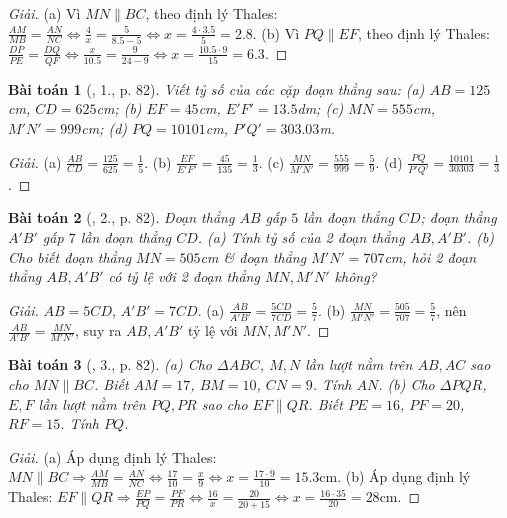 \documentclass{article}
\newtheorem{baitoan}{Bài toán}
\begin{document}
\begin{proof}[Giải]
	(a) Vì $MN\parallel BC$, theo định lý Thales: $\frac{AM}{MB} = \frac{AN}{NC}\Leftrightarrow\frac{4}{x} = \frac{5}{8.5 - 5}\Leftrightarrow x = \frac{4\cdot3.5}{5} = 2.8$. (b) Vì $PQ\parallel EF$, theo định lý Thales: $\frac{DP}{PE} = \frac{DQ}{QF}\Leftrightarrow\frac{x}{10.5} = \frac{9}{24 - 9}\Leftrightarrow x = \frac{10.5\cdot9}{15} = 6.3$.
\end{proof}

\begin{baitoan}[\cite{SBT_Toan_8_tap_2}, 1., p. 82]
	Viết tỷ số của các cặp đoạn thẳng sau: (a) $AB = 125$\emph{cm}, $CD = 625$\emph{cm}; (b) $EF = 45$\emph{cm}, $E'F' = 13.5$\emph{dm}; (c) $MN = 555$\emph{cm}, $M'N' = 999$\emph{cm}; (d) $PQ = 10101$\emph{cm}, $P'Q' = 303.03$\emph{m}.	
\end{baitoan}

\begin{proof}[Giải]
	(a) $\frac{AB}{CD} = \frac{125}{625} = \frac{1}{5}$. (b) $\frac{EF}{E'F'} = \frac{45}{135} = \frac{1}{3}$. (c) $\frac{MN}{M'N'} = \frac{555}{999} = \frac{5}{9}$. (d) $\frac{PQ}{P'Q'} = \frac{10101}{30303} = \frac{1}{3}$.
\end{proof}

\begin{baitoan}[\cite{SBT_Toan_8_tap_2}, 2., p. 82]
	Đoạn thẳng $AB$ gấp $5$ lần đoạn thẳng $CD$; đoạn thẳng $A'B'$ gấp $7$ lần đoạn thẳng $CD$. (a) Tính tỷ số của 2 đoạn thẳng $AB,A'B'$. (b) Cho biết đoạn thẳng $MN = 505$\emph{cm} \& đoạn thẳng $M'N' = 707$\emph{cm}, hỏi 2 đoạn thẳng $AB,A'B'$ có tỷ lệ với 2 đoạn thẳng $MN,M'N'$ không?
\end{baitoan}

\begin{proof}[Giải]
	$AB = 5CD$, $A'B' = 7CD$. (a) $\frac{AB}{A'B'} = \frac{5CD}{7CD} = \frac{5}{7}$. (b) $\frac{MN}{M'N'} = \frac{505}{707} = \frac{5}{7}$, nên $\frac{AB}{A'B'} = \frac{MN}{M'N'}$, suy ra $AB,A'B'$ tỷ lệ với $MN,M'N'$.
\end{proof}

\begin{baitoan}[\cite{SBT_Toan_8_tap_2}, 3., p. 82]
	(a) Cho $\Delta ABC$, $M,N$ lần lượt nằm trên $AB,AC$ sao cho $MN\parallel BC$. Biết $AM = 17$, $BM = 10$, $CN = 9$. Tính $AN$. (b) Cho $\Delta PQR$, $E,F$ lần lượt nằm trên $PQ,PR$ sao cho $EF\parallel QR$. Biết $PE = 16$, $PF = 20$, $RF = 15$. Tính $PQ$.
\end{baitoan}

\begin{proof}[Giải]
	(a) Áp dụng định lý Thales: $MN\parallel BC\Rightarrow\frac{AM}{MB} = \frac{AN}{NC}\Leftrightarrow\frac{17}{10} = \frac{x}{9}\Leftrightarrow x = \frac{17\cdot9}{10} = 15.3$cm. (b) Áp dụng định lý Thales: $EF\parallel QR\Rightarrow\frac{EP}{PQ} = \frac{PF}{PR}\Leftrightarrow\frac{16}{x} = \frac{20}{20 + 15}\Leftrightarrow x = \frac{16\cdot35}{20} = 28$cm.
\end{proof}
\end{document}
